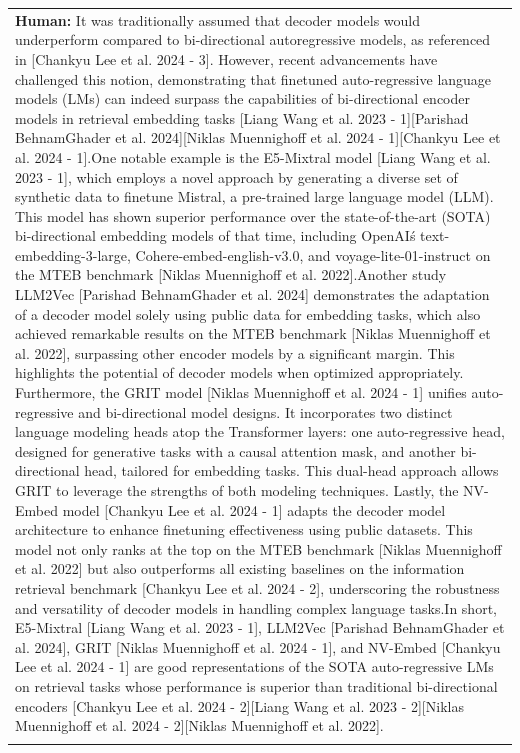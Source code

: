 \begin{table}[t!]
{\begin{tabular}{p{15cm}}
{\bf Human:} It was traditionally assumed that decoder models would underperform compared to bi-directional autoregressive models, as referenced in [Chankyu Lee et al. 2024 - 3]. However, recent advancements have challenged this notion, demonstrating that finetuned auto-regressive language models (LMs) can indeed surpass the capabilities of bi-directional encoder models in retrieval embedding tasks [Liang Wang et al. 2023 - 1][Parishad BehnamGhader et al. 2024][Niklas Muennighoff et al. 2024 - 1][Chankyu Lee et al. 2024 - 1].One notable example is the E5-Mixtral model [Liang Wang et al. 2023 - 1], which employs a novel approach by generating a diverse set of synthetic data to finetune Mistral, a pre-trained large language model (LLM). This model has shown superior performance over the state-of-the-art (SOTA) bi-directional embedding models of that time, including OpenAI\'s text-embedding-3-large, Cohere-embed-english-v3.0, and voyage-lite-01-instruct on the MTEB benchmark [Niklas Muennighoff et al. 2022].Another study LLM2Vec [Parishad BehnamGhader et al. 2024] demonstrates the adaptation of a decoder model solely using public data for embedding tasks, which also achieved remarkable results on the MTEB benchmark [Niklas Muennighoff et al. 2022], surpassing other encoder models by a significant margin. This highlights the potential of decoder models when optimized appropriately. Furthermore, the GRIT model [Niklas Muennighoff et al. 2024 - 1] unifies auto-regressive and bi-directional model designs. It incorporates two distinct language modeling heads atop the Transformer layers: one auto-regressive head, designed for generative tasks with a causal attention mask, and another bi-directional head, tailored for embedding tasks. This dual-head approach allows GRIT to leverage the strengths of both modeling techniques. Lastly, the NV-Embed model [Chankyu Lee et al. 2024 - 1] adapts the decoder model architecture to enhance finetuning effectiveness using public datasets. This model not only ranks at the top on the MTEB benchmark [Niklas Muennighoff et al. 2022] but also outperforms all existing baselines on the information retrieval benchmark [Chankyu Lee et al. 2024 - 2], underscoring the robustness and versatility of decoder models in handling complex language tasks.In short, E5-Mixtral [Liang Wang et al. 2023 - 1], LLM2Vec [Parishad BehnamGhader et al. 2024], GRIT [Niklas Muennighoff et al. 2024 - 1], and NV-Embed [Chankyu Lee et al. 2024 - 1] are good representations of the SOTA auto-regressive LMs on retrieval tasks whose performance is superior than traditional bi-directional encoders [Chankyu Lee et al. 2024 - 2][Liang Wang et al. 2023 - 2][Niklas Muennighoff et al. 2024 - 2][Niklas Muennighoff et al. 2022].  \\\hdashline

\end{tabular}}
\end{table}
